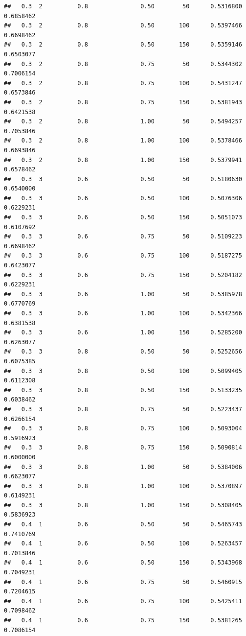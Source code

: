 \documentclass[
  11pt,
]{article}
\begin{document}
\begin{verbatim}
##   0.3  2          0.8               0.50        50      0.5316800  0.6858462
##   0.3  2          0.8               0.50       100      0.5397466  0.6698462
##   0.3  2          0.8               0.50       150      0.5359146  0.6503077
##   0.3  2          0.8               0.75        50      0.5344302  0.7006154
##   0.3  2          0.8               0.75       100      0.5431247  0.6573846
##   0.3  2          0.8               0.75       150      0.5381943  0.6421538
##   0.3  2          0.8               1.00        50      0.5494257  0.7053846
##   0.3  2          0.8               1.00       100      0.5378466  0.6693846
##   0.3  2          0.8               1.00       150      0.5379941  0.6578462
##   0.3  3          0.6               0.50        50      0.5180630  0.6540000
##   0.3  3          0.6               0.50       100      0.5076306  0.6229231
##   0.3  3          0.6               0.50       150      0.5051073  0.6107692
##   0.3  3          0.6               0.75        50      0.5109223  0.6698462
##   0.3  3          0.6               0.75       100      0.5187275  0.6423077
##   0.3  3          0.6               0.75       150      0.5204182  0.6229231
##   0.3  3          0.6               1.00        50      0.5385978  0.6770769
##   0.3  3          0.6               1.00       100      0.5342366  0.6381538
##   0.3  3          0.6               1.00       150      0.5285200  0.6263077
##   0.3  3          0.8               0.50        50      0.5252656  0.6075385
##   0.3  3          0.8               0.50       100      0.5099405  0.6112308
##   0.3  3          0.8               0.50       150      0.5133235  0.6038462
##   0.3  3          0.8               0.75        50      0.5223437  0.6266154
##   0.3  3          0.8               0.75       100      0.5093004  0.5916923
##   0.3  3          0.8               0.75       150      0.5090814  0.6000000
##   0.3  3          0.8               1.00        50      0.5384006  0.6623077
##   0.3  3          0.8               1.00       100      0.5370897  0.6149231
##   0.3  3          0.8               1.00       150      0.5308405  0.5836923
##   0.4  1          0.6               0.50        50      0.5465743  0.7410769
##   0.4  1          0.6               0.50       100      0.5263457  0.7013846
##   0.4  1          0.6               0.50       150      0.5343968  0.7049231
##   0.4  1          0.6               0.75        50      0.5460915  0.7204615
##   0.4  1          0.6               0.75       100      0.5425411  0.7098462
##   0.4  1          0.6               0.75       150      0.5381265  0.7086154

\end{verbatim}
\end{document}
